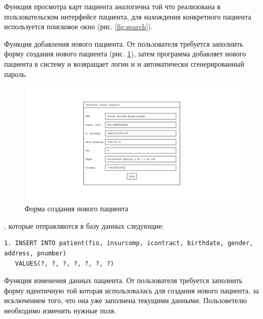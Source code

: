 \documentclass[14pt,a4paper,russian]{extreport}
\begin{document}
Функция просмотра карт пациента аналогична той что реализована в пользовательском интерфейсе пациента, для нахождения конкретного пациента используется поисковое окно (рис. \ref{fig:search}).\par
Функция добавления нового пациента. От пользователя требуется заполнить форму создания нового пациента (рис. \ref{fig:patient-create}), затем программа добавляет нового пациента в систему и возвращает логин и и автоматически сгенерированный пароль.\par
\begin{figure}[h!]
        \includegraphics[width=\textwidth]{prog_int/patient-create}
        \caption{Форма создания нового пациента}
        \label{fig:patient-create}
\end{figure}
, которые отправляются в базу данных следующие: 
\begin{lstlisting}[style=csql] 
1. INSERT INTO patient(fio, insurcomp, icontract, birthdate, gender, address, pnumber)
   VALUES(?, ?, ?, ?, ?, ?, ?)
\end{lstlisting}
\par
Функция изменения данных пациента. От пользователя требуется заполнить форму идентичную той которая использовалась для создания нового пациента, за исключением того, что она уже заполнена текущими данными. Пользоветелю необходимо изменить нужные поля.\par
\end{document}
